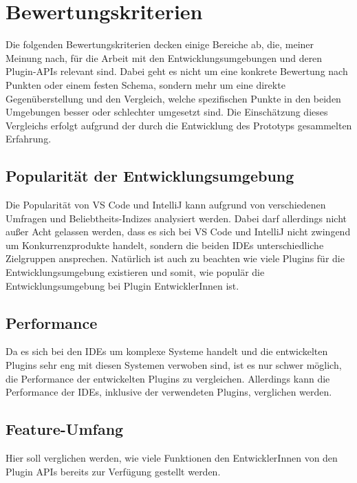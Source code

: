 \chapter{Bewertungskriterien}
\label{cha:Kriterien}

Die folgenden Bewertungskriterien decken einige Bereiche ab,
die, meiner Meinung nach, für die Arbeit mit den Entwicklungsumgebungen
und deren Plugin-APIs relevant sind. Dabei geht es nicht um eine 
konkrete Bewertung nach Punkten oder einem festen Schema, sondern mehr
um eine direkte Gegenüberstellung und den Vergleich, welche spezifischen
Punkte in den beiden Umgebungen besser oder schlechter 
umgesetzt sind. Die Einschätzung dieses Vergleichs erfolgt aufgrund
der durch die Entwicklung des Prototyps gesammelten Erfahrung.

\section{Popularität der Entwicklungsumgebung} 
\label{sec:Kriterien_Popularität}    
Die Popularität von VS Code und IntelliJ kann aufgrund
von verschiedenen Umfragen und Beliebtheits-Indizes 
analysiert werden. Dabei darf allerdings nicht außer
Acht gelassen werden, dass es sich bei VS Code und
IntelliJ nicht zwingend um Konkurrenzprodukte handelt,
sondern die beiden IDEs unterschiedliche Zielgruppen ansprechen.
Natürlich ist auch zu beachten wie viele Plugins 
für die Entwicklungsumgebung existieren und somit, wie 
populär die Entwicklungsumgebung bei Plugin EntwicklerInnen ist. 

\section{Performance} 
\label{sec:Kriterien_Performance}    
Da es sich bei den IDEs um komplexe Systeme handelt und die 
entwickelten Plugins sehr eng mit diesen Systemen verwoben sind,
ist es nur schwer möglich, die Performance der entwickelten
Plugins zu vergleichen. Allerdings kann die Performance 
der IDEs, inklusive der verwendeten Plugins, verglichen werden.

\section{Feature-Umfang} 
\label{sec:Kriterien_FeatureUmfang}    
Hier soll verglichen werden, wie viele Funktionen
den EntwicklerInnen von den Plugin APIs 
bereits zur Verfügung gestellt werden.

